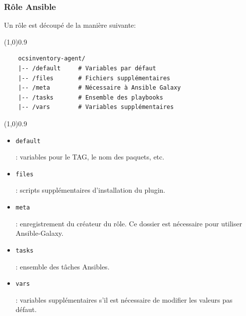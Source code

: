 \documentclass[12pt]{article}
\begin{document}
\subsubsection{Rôle Ansible}
Un rôle est découpé de la manière suivante:
\vspace{-1ex}
\begin{code}
\vspace{-1ex}
\begin{center} 
    \line(1,0){0.9\textwidth} 
\end{center}
\vspace{-1ex}
\begin{verbatim}
    ocsinventory-agent/
    |-- /default     # Variables par défaut
    |-- /files       # Fichiers supplémentaires
    |-- /meta        # Nécessaire à Ansible Galaxy
    |-- /tasks       # Ensemble des playbooks
    |-- /vars        # Variables supplémentaires
\end{verbatim}
\vspace{-1ex}
\begin{center} 
    \line(1,0){0.9\textwidth} 
\end{center}
\vspace{-1ex}
\end{code}

\begin{itemize}
    \item \begin{code}\texttt{default}\end{code}: variables pour le TAG, le nom des paquets, etc.
    \item \begin{code}\texttt{files}\end{code}: scripts supplémentaires d'installation du plugin.
    \item \begin{code}\texttt{meta}\end{code}: enregistrement du créateur du rôle. Ce dossier est nécessaire pour utiliser \gls{Ansible}-Galaxy.
    \item \begin{code}\texttt{tasks}\end{code}: ensemble des tâches Ansibles.
    \item \begin{code}\texttt{vars}\end{code}: variables supplémentaires s'il est nécessaire de modifier les valeurs pas défaut.
\end{itemize}
\end{document}
